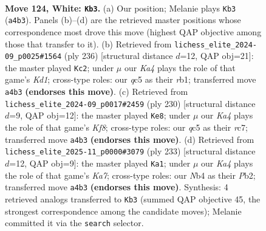 \documentclass[11pt]{article}
\begin{document}
\clearpage

\begin{figure}[p]\centering
\begin{subfigure}{0.46\textwidth}\centering
\resizebox{\linewidth}{!}{%
\newchessgame
\chessboard[
  setfen={7B/3k4/8/2q5/KN6/8/8/8 w - - 16 124},
  showmover=false,
  pgfstyle=straightmove, color=movearrow, markmove={a4-b3}
]}
\caption{}
\end{subfigure}\hfill
\begin{subfigure}{0.46\textwidth}\centering
\resizebox{\linewidth}{!}{%
\newchessgame
\chessboard[
  setfen={8/8/8/8/8/4k3/8/1rNK4 w - - 92 119},
  showmover=false,
  pgfstyle=straightmove, color=movearrow, markmove={d1-c2}
]}
\caption{}
\end{subfigure}
\\[4pt]
\begin{subfigure}{0.46\textwidth}\centering
\resizebox{\linewidth}{!}{%
\newchessgame
\chessboard[
  setfen={5K2/2r1N3/8/8/4k3/8/8/8 w - - 80 116},
  showmover=false,
  pgfstyle=straightmove, color=movearrow, markmove={f8-e8}
]}
\caption{}
\end{subfigure}\hfill
\begin{subfigure}{0.46\textwidth}\centering
\resizebox{\linewidth}{!}{%
\newchessgame
\chessboard[
  setfen={5B2/1K6/8/8/8/8/kpQ5/8 b - - 4 117},
  showmover=false,
  pgfstyle=straightmove, color=movearrow, markmove={a2-a1}
]}
\caption{}
\end{subfigure}
\caption{\textbf{Move 124, White: \texttt{Kb3}.} (a) Our position; Melanie plays \texttt{Kb3} (\texttt{a4b3}). Panels (b)--(d) are the retrieved master positions whose correspondence most drove this move (highest QAP objective among those that transfer to it). (b) Retrieved from \texttt{lichess\_elite\_2024-09\_p0025\#1564} (ply 236) [structural distance $d$=12, QAP obj=21]: the master played \texttt{Kc2}; under $\mu$ our \emph{Ka4} plays the role of that game's \emph{Kd1}; cross-type roles: our \emph{q}c5 as their \emph{r}b1; transferred move \texttt{a4b3} \textbf{(endorses this move)}. (c) Retrieved from \texttt{lichess\_elite\_2024-09\_p0017\#2459} (ply 230) [structural distance $d$=9, QAP obj=12]: the master played \texttt{Ke8}; under $\mu$ our \emph{Ka4} plays the role of that game's \emph{Kf8}; cross-type roles: our \emph{q}c5 as their \emph{r}c7; transferred move \texttt{a4b3} \textbf{(endorses this move)}. (d) Retrieved from \texttt{lichess\_elite\_2025-11\_p0000\#3079} (ply 233) [structural distance $d$=12, QAP obj=9]: the master played \texttt{Ka1}; under $\mu$ our \emph{Ka4} plays the role of that game's \emph{Ka7}; cross-type roles: our \emph{N}b4 as their \emph{P}b2; transferred move \texttt{a4b3} \textbf{(endorses this move)}. Synthesis: 4 retrieved analogs transferred to \texttt{Kb3} (summed QAP objective 45, the strongest correspondence among the candidate moves); Melanie committed it via the \texttt{search} selector.}
\label{fig:thought-m246}
\end{figure}
\end{document}
